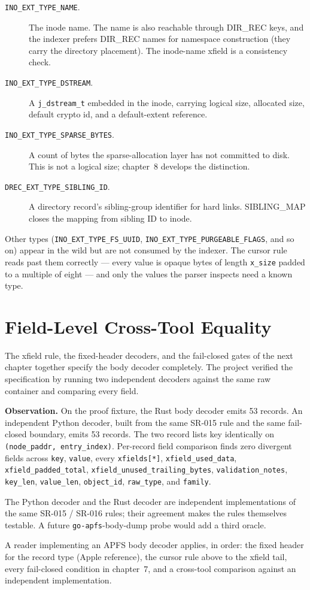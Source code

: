 \begin{description}
  \item[\texttt{INO\_EXT\_TYPE\_NAME}.] The inode name. The name is
    also reachable through DIR\_REC keys, and the indexer prefers
    DIR\_REC names for namespace construction (they carry the
    directory placement). The inode-name xfield is a consistency
    check.
  \item[\texttt{INO\_EXT\_TYPE\_DSTREAM}.] A \texttt{j\_dstream\_t}
    embedded in the inode, carrying logical size, allocated size,
    default crypto id, and a default-extent reference.
  \item[\texttt{INO\_EXT\_TYPE\_SPARSE\_BYTES}.] A count of bytes the
    sparse-allocation layer has not committed to disk. This is not a
    logical size; chapter~8 develops the distinction.
  \item[\texttt{DREC\_EXT\_TYPE\_SIBLING\_ID}.] A directory record's
    sibling-group identifier for hard links. SIBLING\_MAP closes
    the mapping from sibling ID to inode.
\end{description}

Other types (\texttt{INO\_EXT\_TYPE\_FS\_UUID},
\texttt{INO\_EXT\_TYPE\_PURGEABLE\_FLAGS}, and so on) appear in the
wild but are not consumed by the indexer. The cursor rule reads
past them correctly --- every value is opaque bytes of length
\texttt{x\_size} padded to a multiple of eight --- and only the
values the parser inspects need a known type.

\section{Field-Level Cross-Tool Equality}

The xfield rule, the fixed-header decoders, and the fail-closed gates
of the next chapter together specify the body decoder completely.
The project verified the specification by running two independent
decoders against the same raw container and comparing every field.

\textbf{Observation.} On the proof fixture, the Rust body decoder
emits 53 records. An independent Python decoder, built from the
same SR-015 rule and the same fail-closed boundary, emits 53
records. The two record lists key identically on
\texttt{(node\_paddr, entry\_index)}. Per-record field comparison
finds zero divergent fields across \texttt{key}, \texttt{value}, every
\texttt{xfields[*]}, \texttt{xfield\_used\_data},
\texttt{xfield\_padded\_total},
\texttt{xfield\_unused\_trailing\_bytes}, \texttt{validation\_notes},
\texttt{key\_len}, \texttt{value\_len}, \texttt{object\_id},
\texttt{raw\_type}, and \texttt{family}.

The Python decoder and the Rust decoder are independent
implementations of the same SR-015 / SR-016 rules; their agreement
makes the rules themselves testable. A future
\texttt{go-apfs}-body-dump probe would add a third oracle.

A reader implementing an APFS body decoder applies, in order: the
fixed header for the record type (Apple reference), the cursor rule
above to the xfield tail, every fail-closed condition in
chapter~7, and a cross-tool comparison against an independent
implementation.
